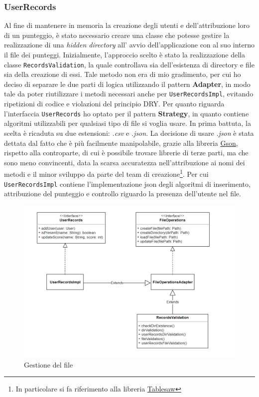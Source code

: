 \documentclass[a4paper,12pt]{report}
\begin{document}
\subsubsection{UserRecords}
Al fine di mantenere in memoria la creazione degli utenti e dell'attribuzione loro di un punteggio, è stato necessario creare una classe che potesse gestire la realizzazione di una \textit{hidden directory} all' avvio dell'applicazione con al suo interno il file dei punteggi. Inizialmente, l'approccio scelto è stato la realizzazione della classe \texttt{RecordsValidation}, la quale controllava sia dell'esistenza di directory e file sia della creazione di essi. Tale metodo non era di mio gradimento, per cui ho deciso di separare le due parti di logica utilizzando il pattern \textbf{Adapter}, in modo tale da poter riutilizzare i metodi necessari anche per \texttt{UserRecordsImpl}, evitando ripetizioni di codice e violazioni del principio DRY. Per quanto riguarda l'interfaccia \texttt{UserRecords} ho optato per il pattern \textbf{Strategy}, in quanto contiene algoritmi utilizzabili per qualsiasi tipo di file si voglia usare. In prima battuta, la scelta è ricaduta su due estensioni: \textit{.csv} e \textit{.json}. La decisione di usare \textit{.json} è stata dettata dal fatto che è più facilmente manipolabile, grazie alla libreria \href{https://github.com/google/gson}{\underline{Gson}}, rispetto alla controparte, di cui è possibile trovare librerie di terze parti, ma che sono meno convincenti, data la scarsa accuratezza nell'attribuzione ai nomi dei metodi e il minor sviluppo da parte del team di creazione\footnote{In particolare si fa riferimento alla libreria \href{https://github.com/jtablesaw/tablesaw}{\underline{Tablesaw}}}. Per cui \texttt{UserRecordsImpl} contiene l'implementazione json degli algoritmi di inserimento, attribuzione del punteggio e controllo riguardo la presenza dell'utente nel file.
\begin{figure}[H]
    \begin{center}
        \centering
        \includegraphics[width=\textwidth]{img/Severi/Records.png}
    \end{center}
    \caption{Gestione del file}
    \label{img:records}
\end{figure}
\end{document}
